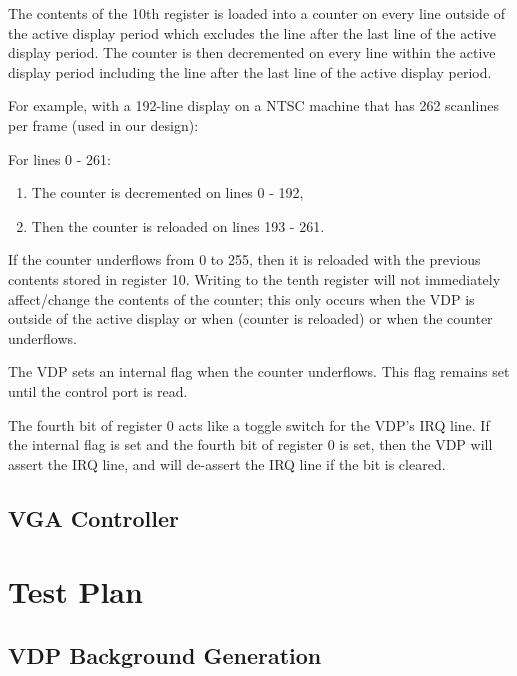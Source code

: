 \documentclass{article}
\begin{document}
The contents of the 10th register is loaded into a counter on every line outside of
the active display period which excludes the line after the last line of the active
display period. The counter is then decremented on every line within the active display
period including the line after the last line of the active display period.

For example, with a 192-line display on a NTSC machine that has 262 scanlines per
frame (used in our design):

For lines 0 - 261:

\vspace{-0.1cm}
\begin{enumerate}
    \item The counter is decremented on lines 0 - 192,
    \item Then the counter is reloaded on lines 193 - 261.
\end{enumerate}

If the counter underflows from 0 to 255, then it is reloaded with the previous contents
stored in register 10. Writing to the tenth register will not immediately affect/change
the contents of the counter; this only occurs when the VDP is outside of the active
display or when (counter is reloaded) or when the counter underflows.

The VDP sets an internal flag when the counter underflows. This flag remains set until
the control port is read.

The fourth bit of register 0 acts like a toggle switch for the VDP's IRQ line. If the
internal flag is set and the fourth bit of register 0 is set, then the VDP will assert
the IRQ line, and will de-assert the IRQ line if the bit is cleared.

\subsection{VGA Controller}

\newpage
\section{Test Plan}

\subsection{VDP Background Generation}
\end{document}
